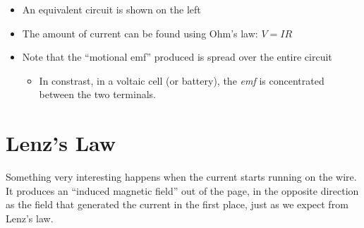 \begin{itemize}
\item An equivalent circuit is shown on the left
\item The amount of current can be found using Ohm's law: $V=IR$
\item Note that the ``motional emf'' produced is spread over the entire
  circuit
  \begin{itemize}
  \item In constrast, in a voltaic cell (or battery), the \emph{emf} is
    concentrated between the two terminals.
  \end{itemize}
\end{itemize}




\section{Lenz's Law}
Something very interesting happens when the current starts running on the
wire.
It produces an ``induced magnetic field'' out of the page, in the opposite
direction as the field that generated the current in the first place, just
as we expect from Lenz's law.

